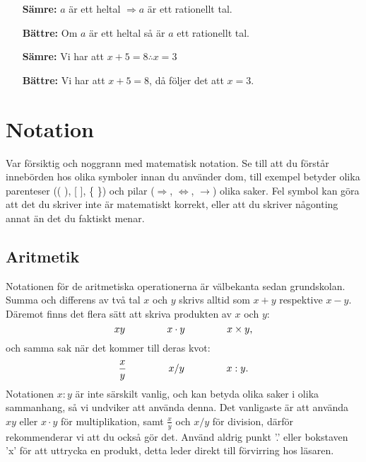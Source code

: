 \documentclass[titlepage]{article}
\begin{document}
\begin{itemize}
        \begin{itemize}[leftmargin=20mm]
            \item[\textbf{Sämre:}] $a$ är ett heltal $\Rightarrow a$ är ett rationellt tal.
            \item[\textbf{Bättre:}] Om $a$ är ett heltal så är $a$ ett rationellt tal.
            \vspace{2mm}
            \item[\textbf{Sämre:}] Vi har att $x+5=8 \therefore x = 3$
            \item[\textbf{Bättre:}]  Vi har att $x+5=8$, då följer det att $x = 3$.
        \end{itemize}
\end{itemize}





\section{Notation}

Var försiktig och noggrann med matematisk notation. Se till att du förstår innebörden hos olika symboler innan du använder dom, till exempel betyder olika parenteser (( ), [ ], \{ \}) och pilar ($\Rightarrow$, $\Leftrightarrow$, $\to$) olika saker. Fel symbol kan göra att det du skriver inte är matematiskt korrekt, eller att du skriver någonting annat än det du faktiskt menar.



\subsection{Aritmetik}

Notationen för de aritmetiska operationerna är välbekanta sedan grundskolan. Summa och differens av två tal $x$ och $y$ skrivs alltid som $x+y$ respektive $x-y$. Däremot finns det flera sätt att skriva produkten av $x$ och $y$:
$$xy \hspace{15mm} x\cdot y \hspace{15mm} x \times y,$$
och samma sak när det kommer till deras kvot:
$$\frac{x}{y} \hspace{15mm} x/y \hspace{15mm}  x : y.$$
Notationen $x:y$ är inte särskilt vanlig, och kan betyda olika saker i olika sammanhang, så vi undviker att använda denna. Det vanligaste är att använda $xy$ eller $x \cdot y$ för multiplikation, samt $\frac{x}{y}$ och $x/y$ för division, därför rekommenderar vi att du också gör det. Använd aldrig punkt '.' eller bokstaven 'x' för att uttrycka en produkt, detta leder direkt till förvirring hos läsaren.
\end{document}
